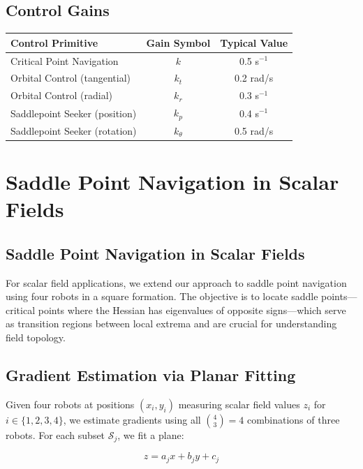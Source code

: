 \documentclass{article}
\begin{document}
\subsection{Control Gains}
\begin{center}
\begin{tabular}{|l|c|c|}
\hline
Control Primitive & Gain Symbol & Typical Value \\
\hline
Critical Point Navigation & $k$ & 0.5 s$^{-1}$ \\
Orbital Control (tangential) & $k_t$ & 0.2 rad/s \\
Orbital Control (radial) & $k_r$ & 0.3 s$^{-1}$ \\
Saddlepoint Seeker (position) & $k_p$ & 0.4 s$^{-1}$ \\
Saddlepoint Seeker (rotation) & $k_\theta$ & 0.5 rad/s \\
\hline
\end{tabular}
\end{center}



\section{Saddle Point Navigation in Scalar Fields}


\subsection{Saddle Point Navigation in Scalar Fields}

For scalar field applications, we extend our approach to saddle point navigation using four robots in a square formation. The objective is to locate saddle points—critical points where the Hessian has eigenvalues of opposite signs—which serve as transition regions between local extrema and are crucial for understanding field topology.

\subsection{Gradient Estimation via Planar Fitting}

Given four robots at positions $(x_i, y_i)$ measuring scalar field values $z_i$ for $i \in \{1,2,3,4\}$, we estimate gradients using all ${4 \choose 3} = 4$ combinations of three robots. For each subset $\mathcal{S}_j$, we fit a plane:

\begin{equation}
z = a_j x + b_j y + c_j
\end{equation}
\end{document}

